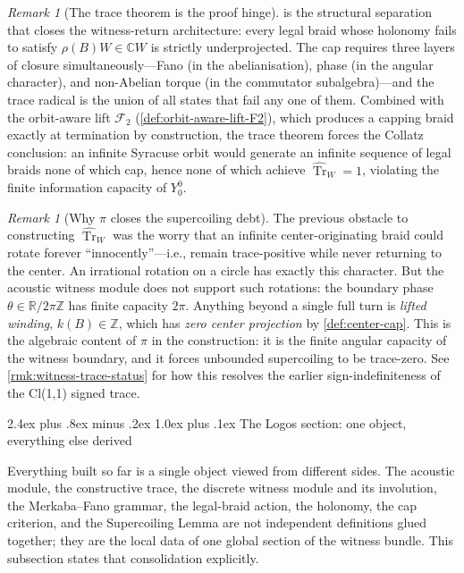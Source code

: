 \documentclass[11pt,a4paper]{article}
\makeatletter
\theoremstyle{plain}
\theoremstyle{definition}
\theoremstyle{remark}
\newtheorem{remark}[theorem]{Remark}
\numberwithin{equation}{section}
\newcommand{\Complex}{\mathbb{C}}
\newcommand{\R}{\mathbb{R}}
\newcommand{\Z}{\mathbb{Z}}
\DeclareMathOperator{\Tr}{Tr}
\renewcommand{\subsection}{%
  \@startsection{subsection}{2}{0pt}%
    {2.4ex plus .8ex minus .2ex}%
    {1.0ex plus .1ex}%
    {\normalfont\Large\bfseries\color{headingAccent}}%
}
\makeatother
\begin{document}
\begin{remark}[The trace theorem is the proof hinge]
\label{rmk:trace-theorem-hinge}
 is the structural separation
that closes the witness-return architecture: every legal braid
whose holonomy fails to satisfy $\rho(B)W\in\Complex W$ is
strictly underprojected.  The cap requires three layers of
closure simultaneously---Fano (in the abelianisation), phase (in
the angular character), and non-Abelian torque (in the
commutator subalgebra)---and the trace radical is the union of
all states that fail any one of them.  Combined with the
orbit-aware lift $\mathcal{F}_2$ (\cref{def:orbit-aware-lift-F2}),
which produces a capping braid exactly at termination by
construction, the trace theorem forces the Collatz conclusion:
an infinite Syracuse orbit would generate an infinite sequence
of legal braids none of which cap, hence none of which achieve
$\widehat{\Tr}_W=1$, violating the finite information capacity of
$Y_0^0$.
\end{remark}

\medskip

\begin{remark}[Why $\pi$ closes the supercoiling debt]
\label{rmk:pi-closes-supercoiling}
The previous obstacle to constructing $\widehat{\Tr}_W$ was the
worry that an infinite center-originating braid could rotate
forever ``innocently''---i.e., remain trace-positive while never
returning to the center.  An irrational rotation on a circle has
exactly this character.  But the acoustic witness module does not
support such rotations: the boundary phase $\theta\in\R/2\pi\Z$ has
finite capacity $2\pi$.  Anything beyond a single full turn is
\emph{lifted winding}, $k(B)\in\Z$, which has \emph{zero center
projection} by \cref{def:center-cap}.  This is the algebraic content
of $\pi$ in the construction: it is the finite angular capacity of
the witness boundary, and it forces unbounded supercoiling to be
trace-zero.  See \cref{rmk:witness-trace-status} for how this
resolves the earlier sign-indefiniteness of the Cl(1,1) signed
trace.
\end{remark}

\subsection{The Logos section: one object, everything else derived}
\label{subsec:logos-section}

Everything built so far is a single object viewed from different
sides.  The acoustic module, the constructive trace, the discrete
witness module and its involution, the Merkaba--Fano grammar, the
legal-braid action, the holonomy, the cap criterion, and the
Supercoiling Lemma are not independent definitions glued together;
they are the local data of one global section of the witness
bundle.  This subsection states that consolidation explicitly.
\end{document}
